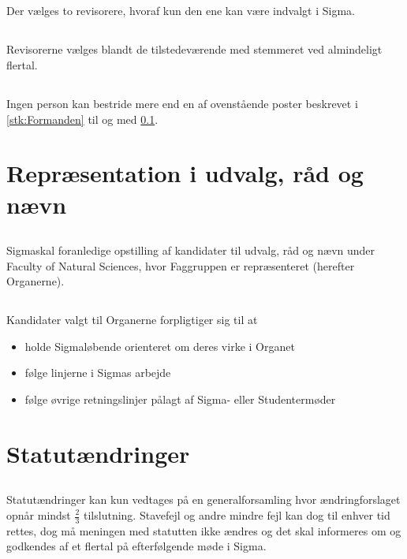 \documentclass[danish,a4paper,twocolumn]{article}
\newcommand{\foreningen}{Sigma}
\newcommand{\fakultetet}{Faculty of Natural Sciences}
\begin{document}
\subsection{}\label{stk:revisorer}Der vælges to revisorere, hvoraf kun den ene kan være indvalgt i \foreningen.
\subsection{}Revisorerne vælges blandt de tilstedeværende med stemmeret ved almindeligt flertal.
\subsection{}Ingen person kan bestride mere end en af ovenstående poster beskrevet i \ref{stk:Formanden} til og med \ref{stk:revisorer}.

\section{Repræsentation i udvalg, råd og nævn}
\subsection{}\foreningen skal foranledige opstilling af kandidater til udvalg, råd og nævn under \fakultetet, hvor Faggruppen er repræsenteret (herefter Organerne).

\subsection{}Kandidater valgt til Organerne forpligtiger sig til at
\begin{itemize}
        \item holde \foreningen løbende orienteret om deres virke i Organet
        \item følge linjerne i \foreningen s arbejde
        \item følge øvrige retningslinjer pålagt af \foreningen- eller Studentermøder
\end{itemize}

\section{Statutændringer}\label{par:aendringer}
\subsection{}Statutændringer kan kun vedtages på en generalforsamling hvor ændringforslaget opnår mindst $\frac{2}{3}$ tilslutning. Stavefejl og andre mindre fejl kan dog til enhver tid rettes, dog må meningen med statutten ikke ændres og det skal informeres om og godkendes af et flertal på efterfølgende møde i \foreningen.
\end{document}
